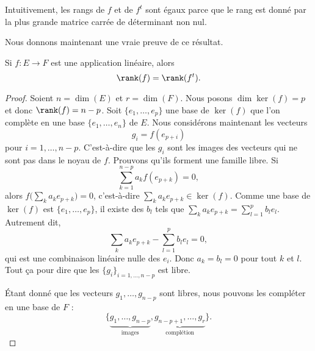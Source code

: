 \begin{normaltext}
	Intuitivement,  les rangs de \( f\) et de \( f^t\) sont égaux parce que le rang est donné par la plus grande matrice carrée de déterminant non nul.

	Nous donnons maintenant une vraie preuve de ce résultat.
\end{normaltext}

\begin{lemma}   \label{LemSEpTcW}
	Si \( f\colon E\to F\) est une application linéaire, alors
	\begin{equation}
		\rank(f)=\rank(f^t).
	\end{equation}
\end{lemma}

\begin{proof}
	Soient \( n=\dim(E)\) et \( r=\dim(F)\).
	Nous posons \( \dim\ker(f)=p\) et donc \( \rank(f)=n-p\). Soit \( \{ e_1,\ldots, e_p \}\) une base de \( \ker(f)\) que l'on complète en une base \( \{ e_1,\ldots, e_n \}\) de \( E\). Nous considérons maintenant les vecteurs
	\begin{equation}
		g_i=f(e_{p+i})
	\end{equation}
	pour \( i=1,\ldots, n-p\). C'est-à-dire que les \( g_i\) sont les images des vecteurs qui ne sont pas dans le noyau de \( f\). Prouvons qu'ils forment une famille libre. Si
	\begin{equation}
		\sum_{k=1}^{n-p}a_kf(e_{p+k})=0,
	\end{equation}
	alors \( f\big( \sum_ka_ke_{p+k} \big)=0\), c'est-à-dire \( \sum_ka_ke_{p+k}\in\ker(f)\). Comme une base de \( \ker(f)\) est \( \{ e_1,\ldots, e_p \}\), il existe des \( b_l\) tels que \( \sum_{k}a_ke_{p+k}=\sum_{l=1}^pb_le_l\). Autrement dit,
	\begin{equation}
		\sum_{k}a_ke_{p+k}-\sum_{l=1}^pb_le_l=0,
	\end{equation}
	qui est une combinaison linéaire nulle des \( e_i\). Donc \( a_k=b_l=0\) pour tout \( k\) et \( l\). Tout ça pour dire que les \( \{ g_i \}_{i=1,\ldots, n-p}\) est libre.

	Étant donné que les vecteurs \( g_1,\ldots, g_{n-p}\) sont libres, nous pouvons les compléter en une base de \( F\) :
	\begin{equation}
		\{ \underbrace{g_1,\ldots, g_{n-p}}_{\text{images}},\underbrace{g_{n-p+1},\ldots, g_r}_{\text{complétion}} \}.
	\end{equation}


\end{proof}
